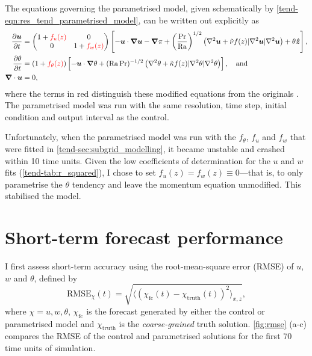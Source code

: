 \documentclass[../main.tex]{subfiles}
\begin{document}
The equations governing the parametrised model, given schematically by
\cref{tend-eqn:res_tend_parametrised_model}, can be written out explicitly as
\begin{align*}
    \frac{\partial \bm{u}}{\partial t} &=
        \begin{pmatrix}
            1 + {\color{red} f_u(z)} & 0 \\
            0 & 1 + {\color{red} f_w(z)}
        \end{pmatrix}
        \left[
            -\bm{u} \cdot \bm{\nabla} \bm{u}
            -\bm{\nabla} \pi
            + \left( \frac{\mathrm{Pr}}{\mathrm{Ra}}\right)^{1/2}
            \left(
                \nabla^2 \bm{u}
                + \tilde{\nu} f(z) |\nabla^2 \bm{u}| \nabla^2 \bm{u}
            \right)
            + \theta \bm{\hat{z}}
        \right], \\
    \frac{\partial \theta}{\partial t} &=
        (1 + {\color{red} f_\theta(z)}) \left[
            -\bm{u} \cdot \bm{\nabla} \theta
            + (\mathrm{Ra}\,\mathrm{Pr})^{-1/2}
            \left(
                \nabla^2 \theta
                + \tilde{\kappa} f(z) |\nabla^2 \theta| \nabla^2 \theta
            \right)
        \right], \quad \text{and} \\
    \bm{\nabla} \cdot \bm{u} &= 0,
\end{align*}
where the terms in red distinguish these modified equations from the originals
. The
parametrised model was run with the same resolution, time step, initial
condition and output interval as the control.

Unfortunately, when the parametrised model was run with the $f_\theta$,
$f_u$ and $f_w$ that were fitted in \cref{tend-sec:subgrid_modelling}, it
became unstable and crashed within 10 time units. Given the low coefficients
of determination for the $u$ and $w$ fits (\cref{tend-tab:r_squared}), I
chose to set $f_u(z) = f_w(z) \equiv 0$---that is, to only parametrise the
$\theta$ tendency and leave the momentum equation unmodified. This stabilised
the model.

\newpage
\section{Short-term forecast performance} \label{sec:forecast}

I first assess short-term accuracy using the root-mean-square error (RMSE)
of $u$, $w$ and $\theta$, defined by
\[
    \mathrm{RMSE}_\chi(t) = \sqrt{\langle
        (\chi_\mathrm{fc}(t) - \chi_\mathrm{truth}(t))^2
    \rangle _{x,z}},
\]
where $\chi = u, w, \theta$, $\chi_\mathrm{fc}$ is the forecast generated by
either the control or parametrised model and $\chi_\mathrm{truth}$ is the
\emph{coarse-grained} truth solution. \cref{fig:rmse} (a-c) compares the RMSE
of the control and parametrised solutions for the first 70 time units of
simulation.
\end{document}

